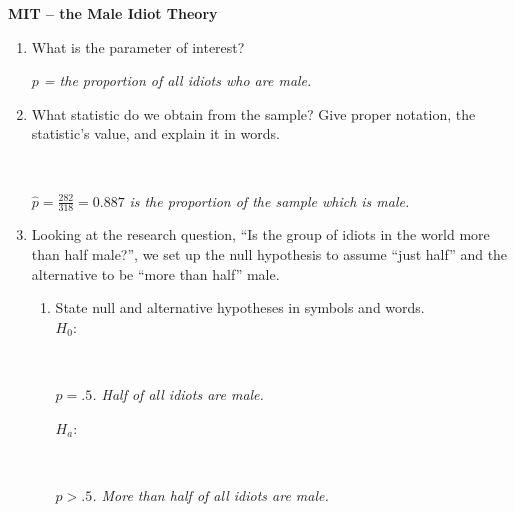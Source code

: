 \def\theTopic{Inference on Proportions }
\def\dayNum{8}

\begin{center}
{\bf {\large MIT -- the Male Idiot Theory}}
\end{center}

\begin{enumerate}
   \item  What is the parameter of interest?
\begin{students}
    \vspace{1cm}    
\end{students}
\begin{key} 
  {\it $p$ = the proportion of all idiots who are male.}
\end{key}
  \item \label{MIT.phat} What statistic do we obtain from the sample?
    Give proper notation, the statistic's value, and explain it in words.
\begin{students}
    \vspace*{2cm}    \\
\end{students}
\begin{key} 
   { $\widehat{p} = \frac{282}{318} = 0.887$ \it is the
    proportion of the sample which is male.}
\end{key}
\item Looking at the research question, ``Is the group of idiots in the world
  more than half male?'',   we set
  up the null hypothesis to assume ``just half'' and the alternative to be
  ``more than half'' male.
    \begin{enumerate}
    \item State null and alternative hypotheses in symbols and
      words.\\
      $H_0:$ 
\begin{students}
    \vspace{1.5cm}    \\
\end{students}
\begin{key} 
{\it $p = .5$.  Half of all idiots are male.}
\end{key}
$H_a:$
\begin{students}
    \vspace{1cm}    \\
\end{students}
\begin{key} 
{\it $p > .5$.  More than half of all idiots are male.}
\end{key}

\end{enumerate}
\end{enumerate}
